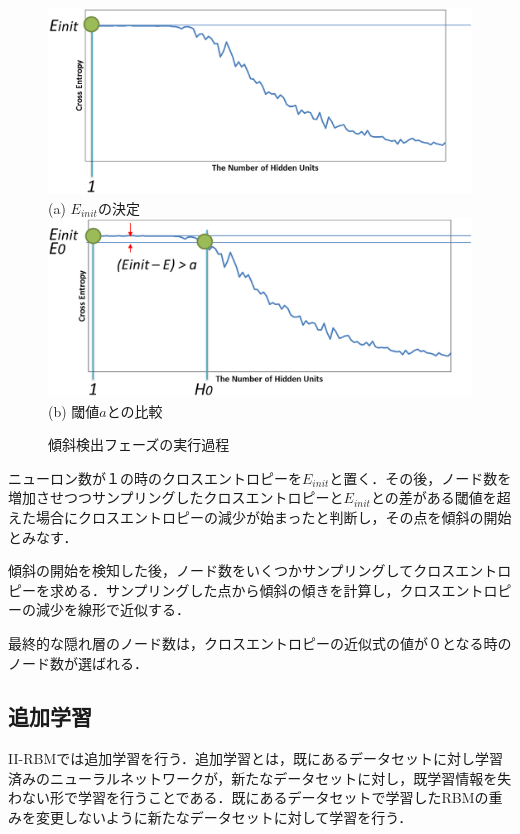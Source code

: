 \begin{figure}[]
\begin{center}
  \includegraphics[scale=0.34]{./myimg/phase1_1.eps} \\
  (a) $E_{init}$の決定 \\
  \includegraphics[scale=0.34]{./myimg/phase1_3.eps} \\
  (b) 閾値$a$との比較 \\
  \caption{傾斜検出フェーズの実行過程}
  \label{fig:phase1}
\end{center}
\end{figure}

ニューロン数が１の時のクロスエントロピーを$E_{init}$と置く．その後，ノード数を増加させつつサンプリングしたクロスエントロピーと$E_{init}$との差がある閾値を超えた場合にクロスエントロピーの減少が始まったと判断し，その点を傾斜の開始とみなす．

傾斜の開始を検知した後，ノード数をいくつかサンプリングしてクロスエントロピーを求める．サンプリングした点から傾斜の傾きを計算し，クロスエントロピーの減少を線形で近似する．

最終的な隠れ層のノード数は，クロスエントロピーの近似式の値が０となる時のノード数が選ばれる．

\subsection{追加学習}
II-RBMでは追加学習を行う．追加学習とは，既にあるデータセットに対し学習済みのニューラルネットワークが，新たなデータセットに対し，既学習情報を失わない形で学習を行うことである．既にあるデータセットで学習したRBMの重みを変更しないように新たなデータセットに対して学習を行う．

